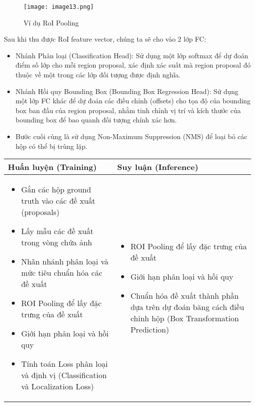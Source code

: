 \documentclass{article}
\begin{document}
\begin{figure}[H]
    \centering
    \texttt{[image: image13.png]}
    \caption{Ví dụ RoI Pooling}
\end{figure}

Sau khi thu được RoI feature vector, chúng ta sẽ cho vào 2 lớp FC:
\begin{itemize}
    \item Nhánh Phân loại (Classification Head): Sử dụng một lớp softmax để dự đoán điểm số lớp cho mỗi region proposal, xác định xác suất mà region proposal đó thuộc về một trong các lớp đối tượng được định nghĩa.
    \item Nhánh Hồi quy Bounding Box (Bounding Box Regression Head): Sử dụng một lớp FC khác để dự đoán các điều chỉnh (offsets) cho tọa độ của bounding box ban đầu của region proposal, nhằm tinh chỉnh vị trí và kích thước của bounding box để bao quanh đối tượng chính xác hơn.
    \item Bước cuối cùng là sử dụng Non-Maximum Suppression (NMS) để loại bỏ các hộp có thể bị trùng lặp.

\end{itemize}


\begin{tabular}{|p{}|p{}|}
\hline
\textbf{Huấn luyện (Training)} & \textbf{Suy luận (Inference)} \\ \hline
\begin{itemize}
    \item Gắn các hộp ground truth vào các đề xuất (proposals)
    \item Lấy mẫu các đề xuất trong vòng chứa ảnh
    \item Nhãn nhánh phân loại và mức tiêu chuẩn hóa các đề xuất
    \item ROI Pooling để lấy đặc trưng của đề xuất
    \item Giới hạn phân loại và hồi quy
    \item Tính toán Loss phân loại và định vị (Classification và Localization Loss)
\end{itemize} &
\begin{itemize}
    \item ROI Pooling để lấy đặc trưng của đề xuất
    \item Giới hạn phân loại và hồi quy
    \item Chuẩn hóa đề xuất thành phần dựa trên dự đoán băng cách điều chỉnh hộp (Box Transformation Prediction)
\end{itemize} \\ \hline
\end{tabular}
\end{document}
